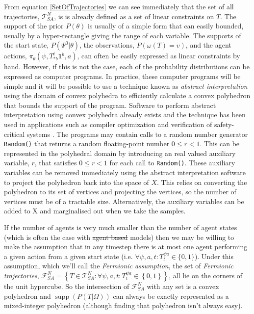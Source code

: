 \documentclass{article}
\DeclareMathOperator\supp{supp}
\providecommand{\DIFaddtex}[1]{{\protect\color{blue}\uwave{#1}}} %
\providecommand{\DIFdeltex}[1]{{\protect\color{red}\sout{#1}}}                      %
\providecommand{\DIFaddbegin}{} %
\providecommand{\DIFaddend}{} %
\providecommand{\DIFdelbegin}{} %
\providecommand{\DIFdelend}{} %
\providecommand{\DIFadd}[1]{\texorpdfstring{\DIFaddtex{#1}}{#1}} %
\providecommand{\DIFdel}[1]{\texorpdfstring{\DIFdeltex{#1}}{}} %
\newcommand{\DIFscaledelfig}{0.5}
\newlength{\DIFdelgraphicswidth} %
\newlength{\DIFdelgraphicsheight} %
\newcommand{\DIFaddincludegraphics}[2][]{{\color{blue}\fbox{\DIFOincludegraphics[#1]{#2}}}} %
\newcommand{\DIFdelincludegraphics}[2][]{%
\sbox{\DIFdelgraphicsbox}{\DIFOincludegraphics[#1]{#2}}%
\settoboxwidth{\DIFdelgraphicswidth}{\DIFdelgraphicsbox} %
\settoboxtotalheight{\DIFdelgraphicsheight}{\DIFdelgraphicsbox} %
\scalebox{\DIFscaledelfig}{%
\parbox[b]{\DIFdelgraphicswidth}{\usebox{\DIFdelgraphicsbox}\\[-\baselineskip] \rule{\DIFdelgraphicswidth}{0em}}\llap{\resizebox{\DIFdelgraphicswidth}{\DIFdelgraphicsheight}{%
\setlength{\unitlength}{\DIFdelgraphicswidth}%
\begin{picture}(1,1)%
\thicklines\linethickness{2pt} %
{\color[rgb]{1,0,0}\put(0,0){\framebox(1,1){}}}%
{\color[rgb]{1,0,0}\put(0,0){\line( 1,1){1}}}%
{\color[rgb]{1,0,0}\put(0,1){\line(1,-1){1}}}%
\end{picture}%
}\hspace*{3pt}}} %
} %
\DeclareRobustCommand{\DIFaddbegin}{\DIFOaddbegin \let\includegraphics\DIFaddincludegraphics} %
\DeclareRobustCommand{\DIFaddend}{\DIFOaddend \let\includegraphics\DIFOincludegraphics} %
\DeclareRobustCommand{\DIFdelbegin}{\DIFOdelbegin \let\includegraphics\DIFdelincludegraphics} %
\DeclareRobustCommand{\DIFdelend}{\DIFOaddend \let\includegraphics\DIFOincludegraphics} %
\begin{document}
From equation \ref{SetOfTrajectories} we can see immediately that the set of all trajectories, $\mathcal{T}^N_{SA}$, is is already defined as a set of linear constraints on $T$. The support of the prior $P(\theta)$ is usually of a simple form that can easily bounded, usually by a hyper-rectangle giving the range of each variable. The supports of the start state, $P(\Psi^0|\theta)$, the observations, $P(\omega(T)=v)$, and the agent actions, $\pi_\theta(\psi,T^t_{*b}\mathbf{1}^b,a)$, can often be easily expressed as linear constraints by hand. However, if this is not the case, each of the probability distributions can be expressed as computer programs. In practice, these computer programs will be simple and it will be possible to use a technique known as \textit{abstract interpretation} \citep{cousot1977abstract} using the domain of convex polyhedra \citep*{cousot1978automatic, becchi2018efficient, fukuda2020polyhedral} to efficiently calculate a convex polyhedron that bounds the support of the program. Software to perform abstract interpretation using convex polyhedra already exists \citep*{henry2012pagai, GN2021, jeannet2009apron, bagnara2008parma} and the technique has been used in applications such as compiler optimization \citep{nsjodin2009design} and verification of safety-critical systems \citep{halbwachs1997verification}. The programs may contain calls to a random number generator \texttt{Random()} that returns a random floating-point number $0 \le r < 1$. This can be represented in the polyhedral domain by introducing an real valued auxiliary variable, $r$, that satisfies $0 \le r < 1$ for each call to \texttt{Random()}. These auxiliary variables can be removed immediately using the abstract interpretation software to project the polyhedron back into the space of $X$. This relies on converting the polyhedron to its set of vertices \citep{motzkin1953double} and projecting the vertices, so the number of vertices must be of a tractable size. Alternatively, the auxiliary variables can be added to X and marginalised out when we take the samples.

If the number of agents is very much smaller than the number of agent states (which is often the case with \DIFdelbegin \DIFdel{agent based }\DIFdelend \DIFaddbegin \DIFadd{agent-based }\DIFaddend models) then we may be willing to make the assumption that in any timestep there is at most one agent performing a given action from a given start state (i.e. $\forall \psi, a, t: T^{\psi a}_t \in \{0,1\}$). Under this assumption, which we'll call the \textit{Fermionic assumption}, the set of \textit{Fermionic trajectories}, $\mathcal{F}^N_{SA} = \left\{T\in\mathcal{T}^N_{SA}: \forall \psi, a, t: T^{\psi a}_t \in \left\{0,1\right\}\right\}$, all lie on the corners of the unit hypercube. So the intersection of $\mathcal{F}^N_{SA}$ with any set is a convex polyhedron and $\supp(P(T|\Omega))$ can always be exactly represented as a mixed-integer polyhedron (although finding that polyhedron isn't always easy).
\end{document}
